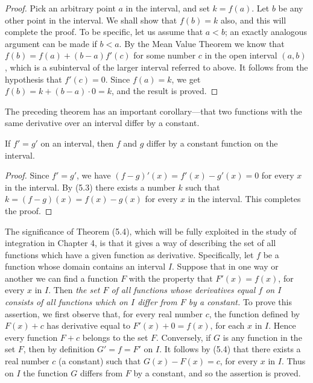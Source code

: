 \begin{proof}
Pick an arbitrary point $a$ in the interval, and set $k = f(a)$. Let $b$ be any other point in the interval. We shall show that $f(b) = k$ also, and this will complete the proof. To be specific, let us assume that $a < b$; an exactly analogous argument can be made if $b < a$. By the Mean Value Theorem we know that $f(b) = f(a) + (b - a) f'(c)$ for some number $c$ in the open interval $(a, b)$, which is a subinterval of the larger interval referred to above. It follows from the hypothesis that $f'(c) = 0$. Since $f(a) = k$, we get $f(b) = k + (b - a) \cdot 0 = k$, and the result is proved.
\end{proof}

The preceding theorem has an important corollary---that two functions with the same derivative over an interval differ by a constant.

\begin{prop}
\label{thm 2.5.4}
If $f' = g'$ on an interval, then $f$ and $g$ differ by a constant function on the interval.
\end{prop}

\begin{proof}
Since $f' = g'$, we have $(f - g)'(x) = f'(x) - g'(x) = 0$ for every $x$ in the interval. By (5.3) there exists a number $k$ such that $k = (f - g)(x) = f(x) - g(x)$ for every $x$ in the interval.  This completes the proof.
\end{proof}

The significance of Theorem (5.4), which will be fully exploited in the study of integration in Chapter 4, is that it gives a way of describing the set of all functions which have a given function as derivative. Specifically, let $f$ be a function whose domain contains an interval $I$. Suppose that in one way or another we can find a function $F$ with the property that $F'(x) = f(x)$, for every $x$ in $I$. Then \textit{the set $F$ of all functions whose derivatives equal $f$ on $I$ consists of all functions which on $I$ differ from $F$ by a constant.} To prove this assertion, we first observe that, for every real number $c$, the function defined by $F(x) + c$ has derivative equal to $F'(x) + 0 = f(x)$, for each $x$ in $I$. Hence every function $F + c$ belongs to the set $F$. Conversely, if $G$ is
any function in the set $F$, then by definition $G' = f = F'$ on $I$. It follows by (5.4) that there exists a real number $c$ (a constant) such that $G(x) - F(x) = c$, for every $x$ in $I$. Thus on $I$ the function $G$ differs from $F$ by a constant, and so the assertion is proved.
\medskip

